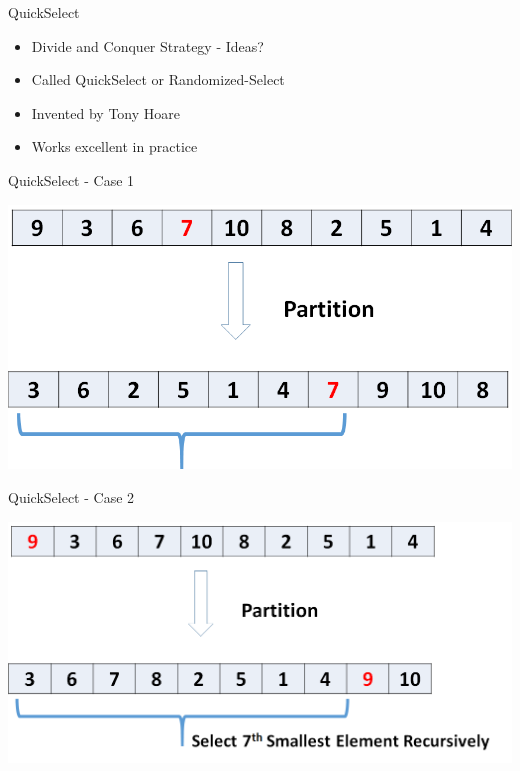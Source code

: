 \documentclass{beamer}
\begin{document}
\begin{frame}{QuickSelect}
\begin{itemize}
    \item Divide and Conquer Strategy - Ideas?
    \item Called QuickSelect or Randomized-Select
    \item Invented by Tony Hoare
    \item Works excellent in practice
\end{itemize}
\end{frame}

\begin{frame}{QuickSelect - Case 1}
\begin{center}
    \includegraphics[scale=0.4]{quickSelectCase1.png}
\end{center}
\end{frame}



\begin{frame}{QuickSelect - Case 2}
\begin{center}
    \includegraphics[scale=0.4]{quickSelectCase2.png}
\end{center}
\end{frame}
\end{document}
